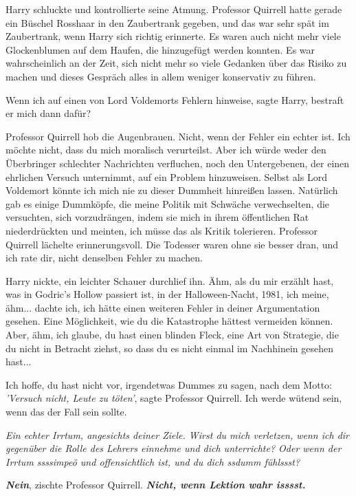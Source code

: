 Harry schluckte und kontrollierte seine Atmung. Professor Quirrell hatte gerade
ein Büschel Rosshaar in den Zaubertrank gegeben, und das war sehr spät im
Zaubertrank, wenn Harry sich richtig erinnerte. Es waren auch nicht mehr viele
Glockenblumen auf dem Haufen, die hinzugefügt werden konnten. Es war
wahrscheinlich an der Zeit, sich nicht mehr so viele Gedanken über das Risiko zu
machen und dieses Gespräch alles in allem weniger konservativ zu führen.

\glqq{}Wenn ich auf einen von Lord Voldemorts Fehlern hinweise\grqq{}, sagte
Harry, \glqq{}bestraft er mich dann dafür?\grqq{}

Professor Quirrell hob die Augenbrauen. \glqq{}Nicht, wenn der Fehler ein echter
ist. Ich möchte nicht, dass du mich moralisch verurteilst. Aber ich würde weder
den Überbringer schlechter Nachrichten verfluchen, noch den Untergebenen, der
einen ehrlichen Versuch unternimmt, auf ein Problem hinzuweisen. Selbst als Lord
Voldemort könnte ich mich nie zu dieser Dummheit hinreißen lassen. Natürlich gab
es einige Dummköpfe, die meine Politik mit Schwäche verwechselten, die
versuchten, sich vorzudrängen, indem sie mich in ihrem öffentlichen Rat
niederdrückten und meinten, ich müsse das als Kritik tolerieren.\grqq{} Professor
Quirrell lächelte erinnerungsvoll. \glqq{}Die Todesser waren ohne sie besser
dran, und ich rate dir, nicht denselben Fehler zu machen.\grqq{}

Harry nickte, ein leichter Schauer durchlief ihn. \glqq{}Ähm, als du mir erzählt
hast, was in Godric's Hollow passiert ist, in der Halloween-Nacht, 1981, ich
meine, ähm... dachte ich, ich hätte einen weiteren Fehler in deiner
Argumentation gesehen. Eine Möglichkeit, wie du die Katastrophe hättest
vermeiden können. Aber, ähm, ich glaube, du hast einen blinden Fleck, eine Art
von Strategie, die du nicht in Betracht ziehst, so dass du es nicht einmal im
Nachhinein gesehen hast...\grqq{}

\glqq{}Ich hoffe, du hast nicht vor, irgendetwas Dummes zu sagen, nach dem Motto:
\emph{'Versuch nicht, Leute zu töten'}\grqq{}, sagte Professor Quirrell. \glqq{}
Ich werde wütend sein, wenn das der Fall sein sollte.\grqq{}

\glqq{}\emph{Ein echter Irrtum, angesichts deiner Ziele. Wirst du mich verletzen,
wenn ich dir gegenüber die Rolle des Lehrers einnehme und dich unterrichte? Oder
wenn der Irrtum ssssimpeö und offensichtlich ist, und du dich ssdumm fühlssst?}\grqq{}

\glqq{}\textbf{\emph{Nein}}\grqq{}, zischte Professor Quirrell. \glqq{}
\textbf{\emph{Nicht, wenn Lektion wahr isssst.}}\grqq{}

